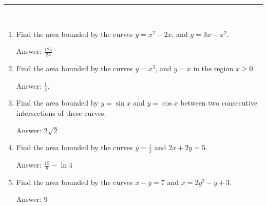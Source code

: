 \documentclass[../calc1-main.tex]{subfiles}
\begin{document}
\rule{\textwidth}{1pt}
\begin{multicols}{2}
\begin{exercise}
~\\
  \begin{enumerate}
    \item Find the area bounded by the curves $y=x^2-2x$, and $y=3x-x^2$.

    Answer: $\frac{125}{24}$

    \item Find the area bounded by the curves $y=x^3$, and $y=x$ in the region $x \ge 0$.

    Answer: $\frac{1}{4}$.

    \item Find the area bounded by $y= \sin x$ and $y= \cos x$ between two consecutive intersections of these curves.

    Answer: $2\sqrt{2}$

    \item Find the area bounded by the curves $y=\frac{1}{x}$ and $2x+2y = 5$.

    Answer: $\frac{15}{8} - \ln4$

    \item Find the area bounded by the curves $x-y=7$ and $x=2y^2-y+3$.

    Answer: $9$
  \end{enumerate}
\end{exercise}
\end{multicols}
\end{document}
